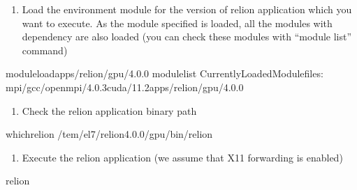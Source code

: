 \documentclass[a4paper,11pt,english]{sphinxmanual}
\begin{document}
\begin{enumerate}
%
\setcounter{enumi}{2}
\item {} 
\sphinxAtStartPar
Load the environment module for the version of relion application which you want to execute. As the module specified is loaded, all the modules with dependency are also loaded (you can check these modules with “module list” command)

\end{enumerate}

\begin{sphinxVerbatim}[commandchars=\\\{\}]
\PYGZdl{}\PYGZgt{}moduleloadapps/relion/gpu/4.0.0
\PYGZdl{}\PYGZgt{}modulelist
CurrentlyLoadedModulefiles:
mpi/gcc/openmpi/4.0.3cuda/11.2apps/relion/gpu/4.0.0
\end{sphinxVerbatim}
\begin{enumerate}
%
\setcounter{enumi}{3}
\item {} 
\sphinxAtStartPar
Check the relion application binary path

\end{enumerate}

\begin{sphinxVerbatim}[commandchars=\\\{\}]
\PYGZdl{}\PYGZgt{}whichrelion
/tem/el7/relion\PYGZhy{}4.0.0/gpu/bin/relion
\end{sphinxVerbatim}
\begin{enumerate}
%
\setcounter{enumi}{4}
\item {} 
\sphinxAtStartPar
Execute the relion application (we assume that X11 forwarding is enabled)

\end{enumerate}

\begin{sphinxVerbatim}[commandchars=\\\{\}]
\PYGZdl{}\PYGZgt{}relion
\end{sphinxVerbatim}

\end{document}
